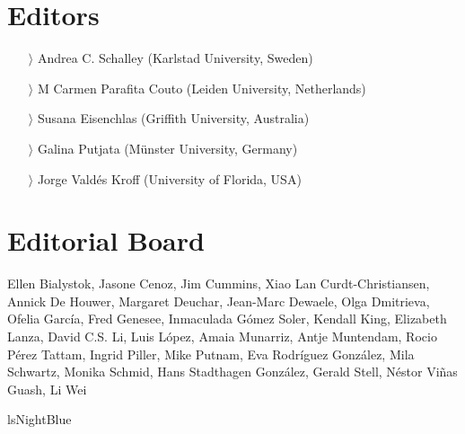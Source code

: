 \documentclass[
notumble,
nofoldmark,
]{leaflet}
\begin{document}
 \color{lsNightBlue} 
{
\section{Editors}    
            
            
\begin{itemize}
    \item[$\rangle$] Andrea C. Schalley (Karlstad University, Sweden) 
    \item[$\rangle$] M Carmen Parafita Couto   (Leiden University, Netherlands) 
    \item[$\rangle$]Susana Eisenchlas (Griffith University, Australia)
    \item[$\rangle$]Galina Putjata (Münster University, Germany)
    \item[$\rangle$]Jorge Valdés Kroff (University of Florida, USA)
\end{itemize}
    \section{Editorial Board}    
\raggedright         
    Ellen Bialystok,
    Jasone Cenoz,
    Jim Cummins,\newline 
    Xiao Lan Curdt-Christiansen,
    Annick De Houwer,
    Margaret Deuchar,
    Jean-Marc Dewaele,
    Olga Dmitrieva,
    Ofelia García,
    Fred Genesee,
    Inmaculada Gómez Soler,
    Kendall King,
    Elizabeth Lanza,
    David C.S. Li,
    Luis López,
    Amaia Munarriz,
    Antje Muntendam,
    Rocio Pérez Tattam,
    Ingrid Piller,
    Mike Putnam,
    Eva Rodríguez González,
    Mila Schwartz,
    Monika Schmid,
    Hans Stadthagen González,
    Gerald Stell,
    Néstor Viñas Guash,
    Li Wei
}{lsNightBlue}
\end{document}
